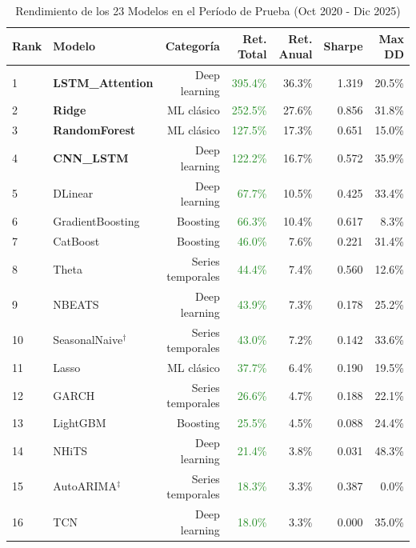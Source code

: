 \begin{table}[htbp]
\centering
\caption{Rendimiento de los 23 Modelos en el Per\'iodo de Prueba (Oct 2020 - Dic 2025)}
\label{tab:model_performance}
\small
\begin{tabular}{@{}llrrrrr@{}}
\toprule
\textbf{Rank} & \textbf{Modelo} & \textbf{Categor\'ia} & \textbf{Ret. Total} & \textbf{Ret. Anual} & \textbf{Sharpe} & \textbf{Max DD} \\
\midrule
1 & \textbf{LSTM\_Attention} & Deep learning & \textcolor{ForestGreen}{395.4\%} & 36.3\% & 1.319 & 20.5\% \\
2 & \textbf{Ridge} & ML cl\'asico & \textcolor{ForestGreen}{252.5\%} & 27.6\% & 0.856 & 31.8\% \\
3 & \textbf{RandomForest} & ML cl\'asico & \textcolor{ForestGreen}{127.5\%} & 17.3\% & 0.651 & 15.0\% \\
4 & \textbf{CNN\_LSTM} & Deep learning & \textcolor{ForestGreen}{122.2\%} & 16.7\% & 0.572 & 35.9\% \\
5 & DLinear & Deep learning & \textcolor{ForestGreen}{67.7\%} & 10.5\% & 0.425 & 33.4\% \\
6 & GradientBoosting & Boosting & \textcolor{ForestGreen}{66.3\%} & 10.4\% & 0.617 & 8.3\% \\
7 & CatBoost & Boosting & \textcolor{ForestGreen}{46.0\%} & 7.6\% & 0.221 & 31.4\% \\
8 & Theta & Series temporales & \textcolor{ForestGreen}{44.4\%} & 7.4\% & 0.560 & 12.6\% \\
9 & NBEATS & Deep learning & \textcolor{ForestGreen}{43.9\%} & 7.3\% & 0.178 & 25.2\% \\
\rowcolor{naivebg} 10 & SeasonalNaive$^\dagger$ & Series temporales & \textcolor{ForestGreen}{43.0\%} & 7.2\% & 0.142 & 33.6\% \\
11 & Lasso & ML cl\'asico & \textcolor{ForestGreen}{37.7\%} & 6.4\% & 0.190 & 19.5\% \\
12 & GARCH & Series temporales & \textcolor{ForestGreen}{26.6\%} & 4.7\% & 0.188 & 22.1\% \\
13 & LightGBM & Boosting & \textcolor{ForestGreen}{25.5\%} & 4.5\% & 0.088 & 24.4\% \\
14 & NHiTS & Deep learning & \textcolor{ForestGreen}{21.4\%} & 3.8\% & 0.031 & 48.3\% \\
15 & AutoARIMA$^\ddagger$ & Series temporales & \textcolor{ForestGreen}{18.3\%} & 3.3\% & 0.387 & 0.0\% \\
16 & TCN & Deep learning & \textcolor{ForestGreen}{18.0\%} & 3.3\% & 0.000 & 35.0\% \\

\end{tabular}
\end{table}
